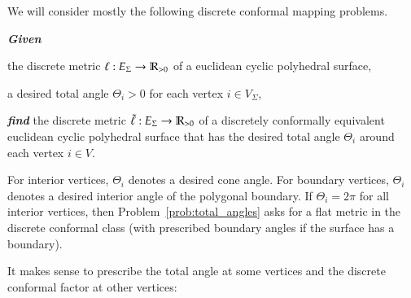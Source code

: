 \documentclass[Thesis.tex]{subfiles}
\begin{document}
We will consider mostly the following discrete conformal mapping problems.
\begin{problem}
\label{prob:total_angles}
\textbf{\itshape{Given}}

\begin{compactitem}
\item the discrete metric $\ell:E_{\Sigma}\rightarrow\mathbb R_{>0}$ of a
euclidean cyclic polyhedral surface,
\item a desired total angle $\Theta_{i}>0$ for each vertex
$i\in V_{\Sigma}$,
\end{compactitem}

\smallskip\noindent%
\textbf{\itshape{find}} the discrete metric
$\tilde\ell:E_{\Sigma}\rightarrow\mathbb R_{>0}$ of a discretely
conformally equivalent euclidean cyclic polyhedral surface that has
the desired total angle $\Theta_{i}$ around each vertex $i\in
V$.
\end{problem}

For interior vertices, $\Theta_i$ denotes a desired cone angle. For
boundary vertices, $\Theta_i$ denotes a desired interior angle of the
polygonal boundary. If $\Theta_{i}=2\pi$ for all interior vertices,
then Problem~\ref{prob:total_angles} asks for a flat metric in the
discrete conformal class (with prescribed boundary angles if the
surface has a boundary).

It makes sense to prescribe the total angle at some vertices and the
discrete conformal factor at other vertices:
\end{document}
